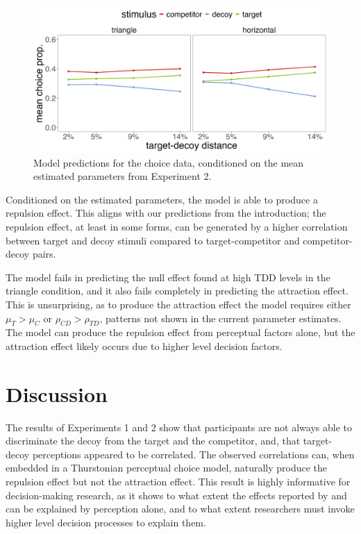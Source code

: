 \begin{figure}
   \includegraphics[width=\textwidth]{figures/bayes_circle_area_sim_choice_sigma_constant_comp_effect.jpeg}
   \caption{Model predictions for the choice data, conditioned on the mean estimated parameters from Experiment 2.}
   \label{fig:e2_model_preds}
\end{figure}

Conditioned on the estimated parameters, the model is able to produce a repulsion effect. This aligns with our predictions from the introduction; the repulsion effect, at least in some forms, can be generated by a higher correlation between target and decoy stimuli compared to target-competitor and competitor-decoy pairs.

The model fails in predicting the null effect found at high TDD levels in the triangle condition, and it also fails completely in predicting the attraction effect. This is unsurprising, as to produce the attraction effect the model requires either $\mu_{T}>\mu_{C}$ or $\rho_{CD}>\rho_{TD}$, patterns not shown in the current parameter estimates. The model can produce the repulsion effect from perceptual factors alone, but the attraction effect likely occurs due to higher level decision factors.

\section{Discussion}

The results of Experiments 1 and 2 show that participants are not always able to discriminate the decoy from the target and the competitor, and, that target-decoy perceptions appeared to be correlated. The observed correlations can, when embedded in a Thurstonian perceptual choice model, naturally produce the repulsion effect but not the attraction effect. This result is highly informative for decision-making research, as it shows to what extent the effects reported by \textcite{trueblood2013not} and \textcite{spektorWhenGoodLooks2018b} can be explained by perception alone, and to what extent researchers must invoke higher level decision processes to explain them. 

